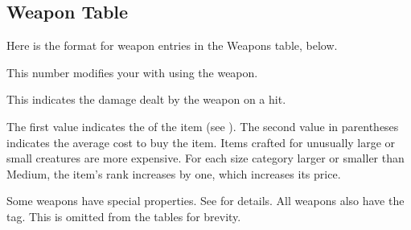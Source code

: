   \subsection{Weapon Table}
    Here is the format for weapon entries in the Weapons table, below.

     This number modifies your  with  using the weapon.

     This  indicates the damage dealt by the weapon on a hit.

     The first value indicates the  of the item (see ).
    The second value in parentheses indicates the average cost to buy the item.
    Items crafted for unusually large or small creatures are more expensive.
    For each size category larger or smaller than Medium, the item's rank increases by one, which increases its price.

     Some weapons have special properties. See  for details.
    All weapons also have the \atPhysical tag.
    This is omitted from the tables for brevity.

